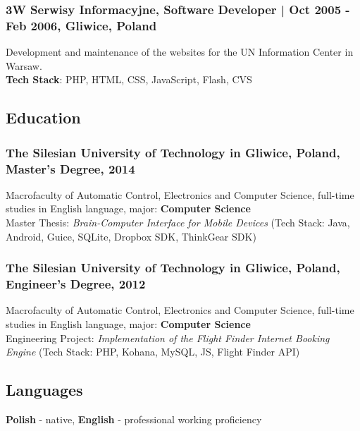 \documentclass[8pt]{extarticle}
\begin{document}
      \subsubsection*{\normalsize{3W Serwisy Informacyjne, Software Developer | Oct 2005 - Feb 2006, Gliwice, Poland}}
      Development and maintenance of the websites for the UN Information Center in Warsaw.\\
      \textbf{Tech Stack}: PHP, HTML, CSS, JavaScript, Flash, CVS

    \subsection*{\normalsize{Education}}

      \subsubsection*{\normalsize{The Silesian University of Technology in Gliwice, Poland, Master's Degree, 2014}}
      Macrofaculty of Automatic Control, Electronics and Computer Science,
      full-time studies in English language, major: \textbf{Computer Science}\\
      Master Thesis: \textit{Brain-Computer Interface for Mobile Devices}
      (Tech Stack: Java, Android, Guice, SQLite, Dropbox SDK, ThinkGear SDK)

      \subsubsection*{\normalsize{The Silesian University of Technology in Gliwice, Poland, Engineer's Degree, 2012}}
      Macrofaculty of Automatic Control, Electronics and Computer Science,
      full-time studies in English language, major: \textbf{Computer Science}\\
      Engineering Project: \textit{Implementation of the Flight Finder Internet Booking Engine}
      (Tech Stack: PHP, Kohana, MySQL, JS, Flight Finder API)

    \subsection*{\normalsize{Languages}}
    \textbf{Polish} - native, \textbf{English} - professional working proficiency
\end{document}
